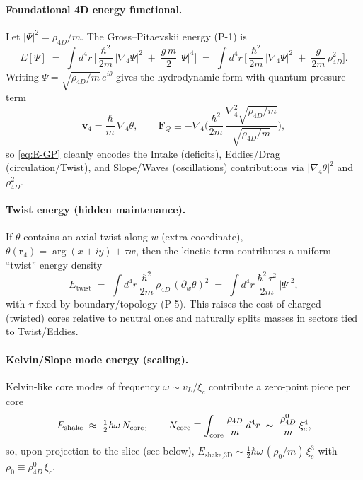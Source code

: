 \paragraph{Foundational 4D energy functional.}
Let $|\Psi|^2=\rho_{4D}/m$. The Gross–Pitaevskii energy (P-1) is
\begin{equation}
E[\Psi] \;=\; \int d^4 r\,\Big[\,\frac{\hbar^2}{2m}\,|\nabla_4\Psi|^2 \;+\; \frac{g\,m}{2}\,|\Psi|^4 \Big]
\;=\; \int d^4 r\,\Big[\,\frac{\hbar^2}{2m}\,|\nabla_4\Psi|^2 \;+\; \frac{g}{2m}\,\rho_{4D}^2 \Big].
\label{eq:E-GP}
\end{equation}
Writing $\Psi=\sqrt{\rho_{4D}/m}\,e^{i\theta}$ gives the hydrodynamic form with quantum-pressure term
\[
\mathbf v_4=\frac{\hbar}{m}\,\nabla_4\theta,\qquad
\mathbf F_Q \equiv -\nabla_4\!\Big(\frac{\hbar^2}{2m}\,\frac{\nabla_4^2\sqrt{\rho_{4D}/m}}{\sqrt{\rho_{4D}/m}}\Big),
\]
so \eqref{eq:E-GP} cleanly encodes the Intake (deficits), Eddies/Drag (circulation/Twist), and Slope/Waves (oscillations) contributions via $|\nabla_4\theta|^2$ and $\rho_{4D}^2$.

\paragraph{Twist energy (hidden maintenance).}
If $\theta$ contains an axial twist along $w$ (extra coordinate), $\theta(\mathbf r_4)=\arg(x+iy)+\tau w$, then the kinetic term contributes a uniform ``twist'' energy density
\begin{equation}
E_{\text{twist}} \;=\; \int d^4 r\, \frac{\hbar^2}{2m}\,\rho_{4D}\,(\partial_w\theta)^2
\;=\; \int d^4 r\, \frac{\hbar^2\,\tau^2}{2m}\,|\Psi|^2 ,
\end{equation}
with $\tau$ fixed by boundary/topology (P-5). This raises the cost of charged (twisted) cores relative to neutral ones and naturally splits masses in sectors tied to Twist/Eddies.

\paragraph{Kelvin/Slope mode energy (scaling).}
Kelvin-like core modes of frequency $\omega\sim v_L/\xi_c$ contribute a zero-point piece per core
\begin{equation}
E_{\text{shake}} \;\approx\; \tfrac{1}{2}\hbar\omega\,N_{\rm core},
\qquad
N_{\rm core} \equiv \int_{\text{core}} \frac{\rho_{4D}}{m}\,d^4 r
\;\sim\; \frac{\rho_{4D}^0}{m}\,\xi_c^4,
\end{equation}
so, upon projection to the slice (see below), $E_{\text{shake,3D}}\sim \tfrac{1}{2}\hbar\omega\,(\rho_0/m)\,\xi_c^3$ with $\rho_0\equiv \rho_{4D}^0\,\xi_c$.

